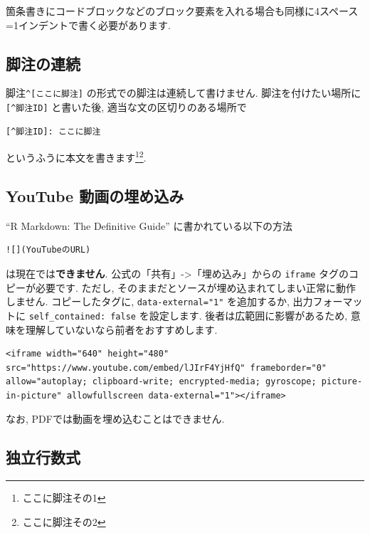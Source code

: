 \documentclass[
]{bxjsarticle}
\begin{document}
箇条書きにコードブロックなどのブロック要素を入れる場合も同様に4スペース=1インデントで書く必要があります.

\hypertarget{ux811aux6ce8ux306eux9023ux7d9a}{%
\subsection{脚注の連続}\label{ux811aux6ce8ux306eux9023ux7d9a}}

脚注\texttt{\^{}{[}ここに脚注{]}} の形式での脚注は連続して書けません. 脚注を付けたい場所に \texttt{{[}\^{}脚注ID{]}} と書いた後, 適当な文の区切りのある場所で

\begin{verbatim}
[^脚注ID]: ここに脚注
\end{verbatim}

というふうに本文を書きます\footnote{ここに脚注その1}\footnote{ここに脚注その2}.

\hypertarget{youtube-ux52d5ux753bux306eux57cbux3081ux8fbcux307f}{%
\subsection{YouTube 動画の埋め込み}\label{youtube-ux52d5ux753bux306eux57cbux3081ux8fbcux307f}}

``R Markdown: The Definitive Guide'' に書かれている以下の方法

\begin{verbatim}
![](YouTubeのURL)
\end{verbatim}

は現在では\textbf{できません}. 公式の「共有」-\textgreater「埋め込み」からの \texttt{iframe} タグのコピーが必要です. ただし, そのままだとソースが埋め込まれてしまい正常に動作しません. コピーしたタグに, \texttt{data-external="1"} を追加するか, 出力フォーマットに \texttt{self\_contained:\ false} を設定します. 後者は広範囲に影響があるため, 意味を理解していないなら前者をおすすめします.

\begin{verbatim}
<iframe width="640" height="480" src="https://www.youtube.com/embed/lJIrF4YjHfQ" frameborder="0" allow="autoplay; clipboard-write; encrypted-media; gyroscope; picture-in-picture" allowfullscreen data-external="1"></iframe>
\end{verbatim}

なお, PDFでは動画を埋め込むことはできません.

\hypertarget{ux72ecux7acbux884cux6570ux5f0f}{%
\subsection{独立行数式}\label{ux72ecux7acbux884cux6570ux5f0f}}
\end{document}
